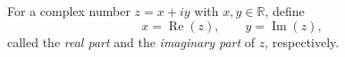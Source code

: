 For a complex number $z = x + iy$ with $x, y \in \mathbb{R}$, define
$$
x = \operatorname{Re}(z), \qquad y = \operatorname{Im}(z),
$$
called the \textit{real part} and the \textit{imaginary part} of $z$, respectively.
